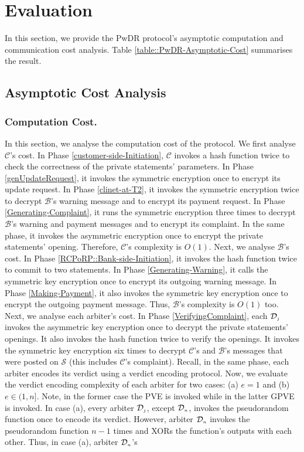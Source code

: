 
\section{Evaluation}
In this section, we provide the PwDR protocol’s asymptotic computation and communication cost analysis. Table \ref{table::PwDR-Asymptotic-Cost} summarises the result. 





\subsection{Asymptotic Cost Analysis}


\subsubsection{Computation Cost.} In this section, we analyse the computation cost of the protocol. We first analyse $\mathcal{C}$'s cost. In Phase \ref{customer-side-Initiation}, $\mathcal{C}$ invokes a hash function twice to check the correctness of the private statements' parameters. In Phase \ref{genUpdateRequest}, it invokes the symmetric encryption once to encrypt its update request. In Phase \ref{clinet-at-T2}, it invokes  the symmetric encryption twice to decrypt $\mathcal{B}$'s warning message and to encrypt its payment request. In Phase \ref{Generating-Complaint}, it runs  the symmetric encryption three times to decrypt $\mathcal{B}$'s warning and payment messages and to encrypt its complaint. In the same phase, it invokes the asymmetric encryption once to encrypt the private statements' opening. Therefore, $\mathcal{C}$'s complexity   is  $O(1)$. Next, we analyse $\mathcal{B}$'s cost. In Phase \ref{RCPoRP::Bank-side-Initiation}, it invokes the hash function twice to commit  to  two statements. In Phase \ref{Generating-Warning}, it calls the symmetric key encryption once to encrypt its outgoing warning message. In Phase \ref{Making-Payment}, it also invokes  the symmetric key encryption once to encrypt the outgoing payment message. Thus, $\mathcal{B}$'s complexity   is  $O(1)$ too. Next, we analyse each arbiter's cost. In Phase \ref{VerifyingComplaint}, each $\mathcal{D}_{\scriptscriptstyle j}$ invokes the asymmetric key encryption once to decrypt the private statements' openings. It also invokes the hash function twice to verify the openings. It invokes the symmetric key encryption six times to decrypt $\mathcal{C}$'s and $\mathcal{B}$'s messages that were posted on $\mathcal{S}$ (this includes $\mathcal{C}$'s complaint). Recall, in the same phase, each arbiter encodes its verdict using a verdict encoding protocol. Now, we evaluate the verdict encoding complexity of each arbiter for two cases: (a)   $e=1$ and (b) $e\in(1, n]$. Note, in the former case the PVE is invoked while in the latter GPVE is invoked. In case (a), every arbiter $\mathcal{D}_{\scriptscriptstyle j}$, except $\mathcal{D}_{\scriptscriptstyle n}$, invokes the pseudorandom function once to encode its verdict. However,  arbiter $\mathcal{D}_{\scriptscriptstyle n}$ invokes the pseudorandom function $n-1$ times and XORs the function's outputs with each other. Thus, in  case (a), arbiter $\mathcal{D}_{\scriptscriptstyle n}$'s 